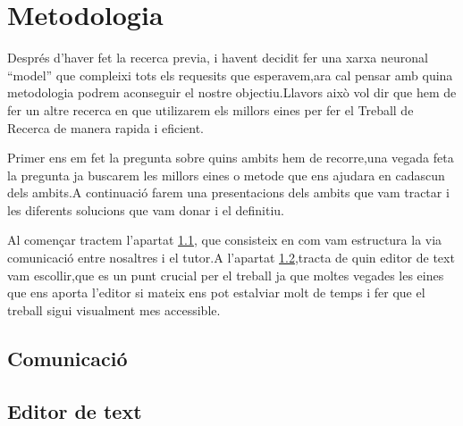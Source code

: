 \chapter{Metodologia}
Després d'haver fet la recerca previa, i havent decidit fer una xarxa neuronal ``model'' que compleixi tots els requesits que esperavem,ara cal pensar amb quina metodologia podrem aconseguir el nostre objectiu.Llavors això vol dir que hem de fer un altre recerca en que utilizarem els millors eines per fer el Treball de Recerca de manera rapida i eficient.

Primer ens em fet la pregunta sobre quins ambits hem de recorre,una vegada feta la pregunta ja buscarem les millors eines o metode que ens ajudara en cadascun dels ambits.A continuació farem una presentacions dels ambits que vam tractar i les diferents solucions que vam donar i el definitiu.

Al començar tractem  l'apartat \ref{4.1}, que consisteix en com vam estructura la via comunicació entre nosaltres i el tutor.A l'apartat \ref{4.2},tracta de quin editor de text vam escollir,que es un punt crucial per el treball ja que moltes vegades les eines que ens aporta l'editor si mateix ens pot estalviar molt de temps i fer que el treball sigui visualment mes accessible.




\section{Comunicació}\label{4.1}
\section{Editor de text}\label{4.2}
